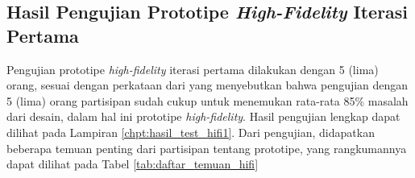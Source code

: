 \subsection{Hasil Pengujian Prototipe \textit{High-Fidelity} Iterasi Pertama}
\label{subsec:test_1_hasil}

Pengujian prototipe \textit{high-fidelity} iterasi pertama dilakukan dengan 5 (lima) orang, sesuai dengan perkataan dari \textcite{nielsenusabilityproblems} yang menyebutkan bahwa pengujian dengan 5 (lima) orang partisipan sudah cukup untuk menemukan rata-rata 85\% masalah dari desain, dalam hal ini prototipe \textit{high-fidelity}. Hasil pengujian lengkap dapat dilihat pada Lampiran \ref{chpt:hasil_test_hifi1}. Dari pengujian, didapatkan beberapa temuan penting dari partisipan tentang prototipe, yang rangkumannya dapat dilihat pada Tabel \ref{tab:daftar_temuan_hifi}


